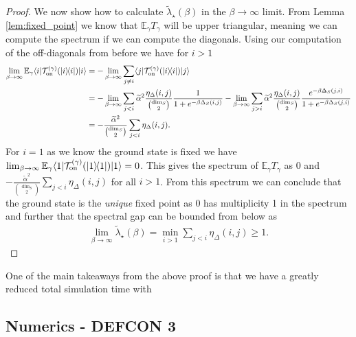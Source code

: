 \documentclass{article}
\newcommand{\on}{\rm on}
\newcommand{\ket}[1]{|#1\rangle}
\newcommand{\bra}[1]{\langle #1|}
\newcommand{\ketbra}[2]{| #1\rangle\! \langle #2|}
\newcommand{\EE}{\mathbb{E}}
\newcommand{\TT}{\mathcal{T}}
\begin{document}
\begin{proof}
We now show how to calculate $\widetilde{\lambda}_\star(\beta)$ in the $\beta \to \infty$ limit. From Lemma \ref{lem:fixed_point} we know that $\EE_\gamma T_\gamma$ will be upper triangular, meaning we can compute the spectrum if we can compute the diagonals. Using our computation of the off-diagonals from before we have for $i > 1$
\begin{align}
    \lim_{\beta \to \infty} \EE_\gamma \bra{i} \TT_{\on}^{(\gamma)}(\ketbra{i}{i}) \ket{i} &= - \lim_{\beta \to \infty} \sum_{j \neq i} \bra{j} \TT_{\on}^{(\gamma)}(\ketbra{i}{i}) \ket{j} \\
    &= - \lim_{\beta \to \infty} \sum_{j < i} \widetilde{\alpha}^2 \frac{\eta_\Delta(i,j)}{\binom{\dim_S}{2}} \frac{1}{1 + e^{-\beta \Delta_S(i,j)}} - \lim_{\beta \to \infty} \sum_{j > i} \widetilde{\alpha}^2 \frac{\eta_\Delta(i,j)}{\binom{\dim_S}{2}} \frac{e^{-\beta \Delta_S(j, i)}}{1 + e^{-\beta \Delta_S(j, i)}} \\
    &= - \frac{\widetilde{\alpha}^2}{\binom{\dim_S}{2}} \sum_{j < i} \eta_\Delta(i,j).
\end{align}
For $i = 1$ as we know the ground state is fixed we have $\lim_{\beta \to \infty} \EE_\gamma \bra{1} \TT_{\on}^{(\gamma)}(\ketbra{1}{1}) \ket{1} = 0$. This gives the spectrum of $\EE_\gamma T_\gamma$ as 0 and $- \frac{\widetilde{\alpha}^2}{\binom{\dim_S}{2}} \sum_{j < i} \eta_\Delta(i,j)$ for all $i > 1$. From this spectrum we can conclude that the ground state is the \emph{unique} fixed point as 0 has multiplicity 1 in the spectrum and further that the spectral gap can be bounded from below as
\begin{align}
    \lim_{\beta \to \infty} \widetilde{\lambda}_\star(\beta) = \min_{i > 1} \sum_{j < i} \eta_\Delta(i,j) \ge 1.
\end{align}
\end{proof}

One of the main takeaways from the above proof is that we have a greatly reduced total simulation time with 

\subsection{Numerics - DEFCON 3} \label{sec:general_numerics}
\end{document}
